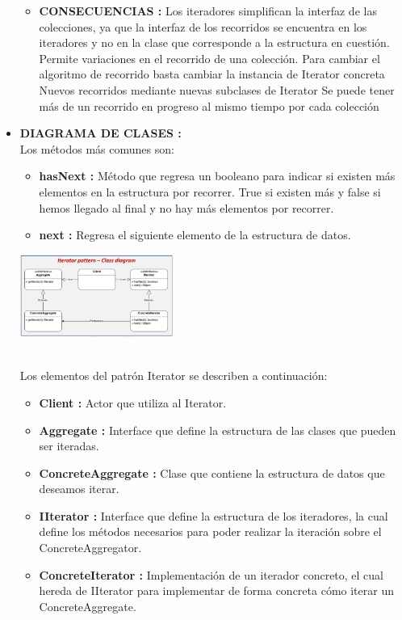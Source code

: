 \documentclass[twoside,twocolumn]{article}
\begin{document}
\begin{itemize}
\begin{itemize}
            
		\item \textbf{CONSECUENCIAS  :}	Los iteradores simplifican la interfaz de las colecciones, ya que la interfaz de los recorridos se encuentra en los iteradores y no en la clase que corresponde a la estructura en cuestión. 
        Permite variaciones en el recorrido de una colección. 
        Para cambiar el algoritmo de recorrido basta cambiar la instancia de Iterator concreta  Nuevos recorridos mediante nuevas subclases de Iterator  
        Se puede tener más de un recorrido en progreso al mismo tiempo por cada colección
        
        
	\end{itemize}
	
	\item \textbf{DIAGRAMA DE CLASES :}	\\
    Los métodos más comunes son:

    \begin{itemize}
        \item \textbf{hasNext  :} Método que regresa un booleano para indicar si existen más elementos en la estructura por recorrer. True si existen más y false si hemos llegado al final y no hay más elementos por recorrer.
        \item \textbf{next  :} Regresa el siguiente elemento de la estructura de datos.
        \end{itemize} 

        \begin{center}
            \includegraphics[width=5cm]{./img/Imagen10.png} 
        \end{center}
        \\
        Los elementos del patrón Iterator se describen a continuación:

        \begin{itemize}
            \item \textbf{Client  :} Actor que utiliza al Iterator.
            \item \textbf{Aggregate  :} Interface que define la estructura de las clases que pueden ser iteradas.
            \item \textbf{ConcreteAggregate  :} Clase que contiene la estructura de datos que deseamos iterar.
            \item \textbf{IIterator  :} Interface que define la estructura de los iteradores, la cual define los métodos necesarios para poder realizar la iteración sobre el ConcreteAggregator.
            \item \textbf{ConcreteIterator  :} Implementación de un iterador concreto, el cual hereda de IIterator para implementar de forma concreta cómo iterar un ConcreteAggregate.
            \end{itemize} 



\end{itemize}
\end{document}
